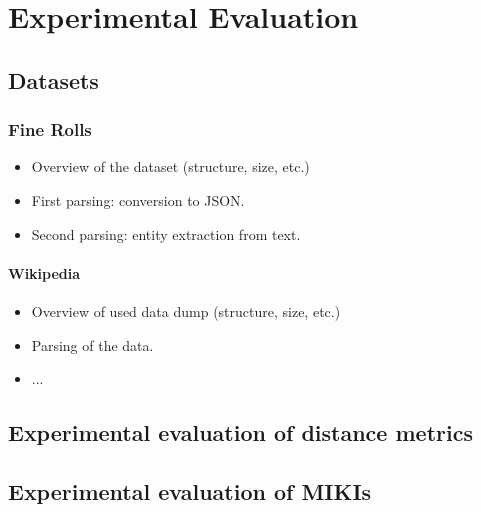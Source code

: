 \chapter{Experimental Evaluation}
\label{ch:experiments}




\section{Datasets}
\label{sec:datasets}




\subsection{Fine Rolls}
\label{subsec:fine_rolls}

\begin{itemize}
	\item Overview of the dataset (structure, size, etc.)
	\item First parsing: conversion to JSON.
	\item Second parsing: entity extraction from text.
\end{itemize}




\subsubsection{Wikipedia}
\label{subsec:wikipedia}
	
\begin{itemize}
	\item Overview of used data dump (structure, size, etc.)
	\item Parsing of the data.
	\item ...
\end{itemize}




\section{Experimental evaluation of distance metrics}
\label{sec:distance_evaluation}




\section{Experimental evaluation of MIKIs}
\label{sec:miki_evaluation}

